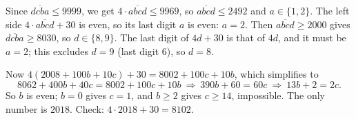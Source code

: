 Since $\overline{dcba}\le9999$, we get $4\cdot\overline{abcd}\le9969$, so $\overline{abcd}\le2492$ and $a\in\{1,2\}$. The left side $4\cdot\overline{abcd}+30$ is even, so its last digit $a$ is even: $a=2$. Then $\overline{abcd}\ge2000$ gives $\overline{dcba}\ge8030$, so $d\in\{8,9\}$. The last digit of $4d+30$ is that of $4d$, and it must be $a=2$; this excludes $d=9$ (last digit $6$), so $d=8$.

Now $4(2008+100b+10c)+30=8002+100c+10b$, which simplifies to
\[
8062+400b+40c=8002+100c+10b\ \Longrightarrow\ 390b+60=60c\ \Longrightarrow\ 13b+2=2c .
\]
So $b$ is even; $b=0$ gives $c=1$, and $b\ge2$ gives $c\ge14$, impossible. The only number is $\boxed{2018}$. Check: $4\cdot2018+30=8102$.
